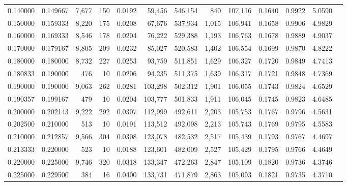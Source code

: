 \begin{tabular}{rrrrrrrrrrrrr}
0.140000 & 0.149667 &  7,677 &   150 &                                     0.0192 &  59,456 & 546,154 &     840 & 107,116 & 0.1640 & 0.9922 & 5.0590 \\
0.150000 & 0.159333 &  8,220 &   175 &                                     0.0208 &  67,676 & 537,934 &   1,015 & 106,941 & 0.1658 & 0.9906 & 4.9829 \\
0.160000 & 0.169333 &  8,546 &   178 &                                     0.0204 &  76,222 & 529,388 &   1,193 & 106,763 & 0.1678 & 0.9889 & 4.9037 \\
0.170000 & 0.179167 &  8,805 &   209 &                                     0.0232 &  85,027 & 520,583 &   1,402 & 106,554 & 0.1699 & 0.9870 & 4.8222 \\
0.180000 & 0.180000 &  8,732 &   227 &                                     0.0253 &  93,759 & 511,851 &   1,629 & 106,327 & 0.1720 & 0.9849 & 4.7413 \\
0.180833 & 0.190000 &    476 &    10 &                                     0.0206 &  94,235 & 511,375 &   1,639 & 106,317 & 0.1721 & 0.9848 & 4.7369 \\
0.190000 & 0.190000 &  9,063 &   262 &                                     0.0281 & 103,298 & 502,312 &   1,901 & 106,055 & 0.1743 & 0.9824 & 4.6529 \\
0.190357 & 0.199167 &    479 &    10 &                                     0.0204 & 103,777 & 501,833 &   1,911 & 106,045 & 0.1745 & 0.9823 & 4.6485 \\
0.200000 & 0.202143 &  9,222 &   292 &                                     0.0307 & 112,999 & 492,611 &   2,203 & 105,753 & 0.1767 & 0.9796 & 4.5631 \\
0.202500 & 0.210000 &    513 &    10 &                                     0.0191 & 113,512 & 492,098 &   2,213 & 105,743 & 0.1769 & 0.9795 & 4.5583 \\
0.210000 & 0.212857 &  9,566 &   304 &                                     0.0308 & 123,078 & 482,532 &   2,517 & 105,439 & 0.1793 & 0.9767 & 4.4697 \\
0.213333 & 0.220000 &    523 &    10 &                                     0.0188 & 123,601 & 482,009 &   2,527 & 105,429 & 0.1795 & 0.9766 & 4.4649 \\
0.220000 & 0.225000 &  9,746 &   320 &                                     0.0318 & 133,347 & 472,263 &   2,847 & 105,109 & 0.1820 & 0.9736 & 4.3746 \\
0.225000 & 0.229500 &    384 &    16 &                                     0.0400 & 133,731 & 471,879 &   2,863 & 105,093 & 0.1821 & 0.9735 & 4.3710 \\

\end{tabular}
